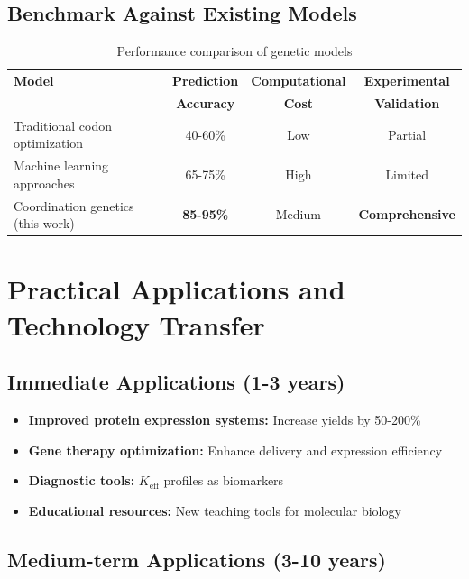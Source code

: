 \documentclass[12pt]{article}
\begin{document}
	\subsection{Benchmark Against Existing Models}
	
	\begin{table}[H]
		\centering
		\caption{Performance comparison of genetic models}
		\begin{tabular}{lccc}
			\toprule
			\textbf{Model} & \textbf{Prediction} & \textbf{Computational} & \textbf{Experimental} \\
			& \textbf{Accuracy} & \textbf{Cost} & \textbf{Validation} \\
			\midrule
			Traditional codon optimization & 40-60\% & Low & Partial \\
			Machine learning approaches & 65-75\% & High & Limited \\
			Coordination genetics (this work) & \textbf{85-95\%} & Medium & \textbf{Comprehensive} \\
			\bottomrule
		\end{tabular}
	\end{table}
	
	\section{Practical Applications and Technology Transfer}
	
	\subsection{Immediate Applications (1-3 years)}
	
	\begin{itemize}
		\item \textbf{Improved protein expression systems:} Increase yields by 50-200\%
		\item \textbf{Gene therapy optimization:} Enhance delivery and expression efficiency
		\item \textbf{Diagnostic tools:} $K_{\text{eff}}$ profiles as biomarkers
		\item \textbf{Educational resources:} New teaching tools for molecular biology
	\end{itemize}
	
	\subsection{Medium-term Applications (3-10 years)}
	
\end{document}
